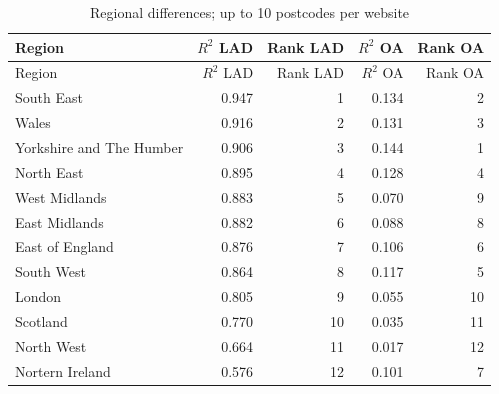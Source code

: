\documentclass[
  authoryear,
  preprint,
  3p]{elsarticle}
\begin{document}
\begin{longtable}[]{@{}lrrrr@{}}
\caption{Regional differences; up to 10 postcodes per
website\label{table.regions.no.imp}}\tabularnewline
\toprule\noalign{}
Region & \(R^2\) LAD & Rank LAD & \(R^2\) OA & Rank OA \\
\midrule\noalign{}
\endfirsthead
\toprule\noalign{}
Region & \(R^2\) LAD & Rank LAD & \(R^2\) OA & Rank OA \\
\midrule\noalign{}
\endhead
\bottomrule\noalign{}
\endlastfoot
South East & 0.947 & 1 & 0.134 & 2 \\
Wales & 0.916 & 2 & 0.131 & 3 \\
Yorkshire and The Humber & 0.906 & 3 & 0.144 & 1 \\
North East & 0.895 & 4 & 0.128 & 4 \\
West Midlands & 0.883 & 5 & 0.070 & 9 \\
East Midlands & 0.882 & 6 & 0.088 & 8 \\
East of England & 0.876 & 7 & 0.106 & 6 \\
South West & 0.864 & 8 & 0.117 & 5 \\
London & 0.805 & 9 & 0.055 & 10 \\
Scotland & 0.770 & 10 & 0.035 & 11 \\
North West & 0.664 & 11 & 0.017 & 12 \\
Nortern Ireland & 0.576 & 12 & 0.101 & 7 \\
\end{longtable}
\end{document}

